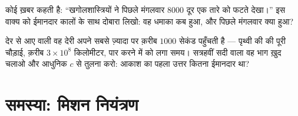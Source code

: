 \begin{exercise}[$\star\star$]\label{exo:g8:speed-of-light:11}
कोई ख़बर कहती है: ``खगोलशास्त्रियों ने पिछले मंगलवार $8000$ 
दूर एक तारे को फटते देखा।'' इस वाक्य को ईमानदार कालों के साथ दोबारा
लिखो: वह धमाका कब हुआ, और पिछले मंगलवार क्या हुआ?
\end{exercise}

\begin{exercise}[$\star\star\star$]\label{exo:g8:speed-of-light:12}
देर से आए  वाली वह देरी अपने सबसे ज़्यादा पर क़रीब $1000$ सेकंड
पहुँचती है --- पृथ्वी की  की पूरी चौड़ाई, क़रीब $3 \times
10^{8}$ किलोमीटर, पार करने में  को लगा समय। सत्रहवीं सदी वाला
वह भाग ख़ुद चलाओ और आधुनिक $c$ से तुलना करो: आकाश का पहला उत्तर कितना
ईमानदार था?
\end{exercise}

\section{समस्या: मिशन नियंत्रण}


